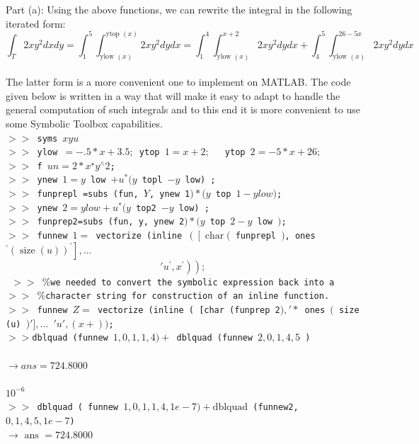 \documentclass[../main.tex]{subfiles}
\begin{document}
Part (a): Using the above functions, we can rewrite the integral in the following 
iterated form: 
$$
\int_{T} 2 x y^{2} d x d y=\int_{1}^{5} \int_{\text {ylow }(x)}^{\text {ytop }(x)} 2 x y^{2} d y d x=\int_{1}^{4} \int_{\text {ylow }(x)}^{x+2} 2 x y^{2} d y d x+\int_{4}^{5} \int_{\text {ylow }(x)}^{26-5 x} 2 x y^{2} d y d x
$$
\\
The latter form is a more convenient one to implement on MATLAB. The code 
given below is written in a way that will make it easy to adapt to handle the 
general computation of such integrals and to this end it is more convenient to use 
some Symbolic Toolbox capabilities. 
\\
\texttt{$>>$ syms $x y u$\\
$>>$ ylow $=-.5 * x+3.5 ;$ ytop $1=x+2 ; \quad$ ytop $2=-5 * x+26 ;$\\
$>>$ f $u n=2 * x^{\star} y^{\wedge} 2$;\\
$>>$ ynew $1=y$ low $+u^{*}(y$ topl $-y$ low) ;\\
$>>$ funprepl =subs (fun, $Y$, ynew 1$) *(y$ top $1-y l o w)$;\\
$>>$ ynew $2=y l o w+u^{*}(y$ top2 $-y$ low) ;\\
$>>$ funprep2=subs (fun, y, ynew 2$) *(y$ top $2-y$ low $)$;\\
$>>$ funnew $1=$ vectorize (inline $\left(\left[\operatorname{char}(\right.\right.$ funprepl $)$, ones $\left.^{\prime}(\operatorname{size}(u))^{\prime}\right], \ldots$
$$
\left.\left.' u^{\prime}, x^{\prime}\right)\right) \text {; }
$$
$>>$ $\%$we needed to convert the symbolic expression back into a\\
$>>$ $\%$character string for construction of an inline function.\\
$>>$ funnew $Z=$ vectorize (inline ( [char (funprep 2$), ' *$ ones $($ size (u) $) '], \ldots$
$' u ',(x+))$;\\
$>>$dblquad (funnew $1,0,1,1,4)+$ dblquad (funnew $2,0,1,4,5$ )\\
\\
$\rightarrow ans = 724.8000$ }
\\
\\
 $10^{-6}$ 
\\
\texttt{$>>$ dblquad ( funnew $1,0,1,1,4,1 e-7)+\mathrm{dblquad}$ (funnew2, $0,1,4,5,1 e-7$)
\\
$
\rightarrow \text { ans }=724.8000
$}
\\
\\
\end{document}
